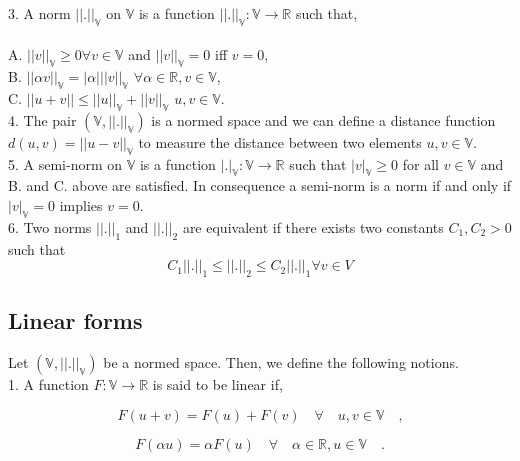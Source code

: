 \documentclass[a4paper,openany]{book}
\begin{document}
\begin{appendices}
3. A norm $||.||_\mathbb{V}$ on $\mathbb{V}$ is a function $||.||_\mathbb{V} : \mathbb{V} \rightarrow \mathbb{R}$ such that,
\\ 
\\
A. $||v||_\mathbb{V} \geq 0 \forall v \in \mathbb{V}$ and $||v||_\mathbb{V} = 0$ iff $v=0$,\\
B. $||\alpha v||_\mathbb{V} = |\alpha| ||v||_\mathbb{V}$  $\forall \alpha \in \mathbb{R}, v \in \mathbb{V}$,\\
C. $||u+v|| \leq ||u||_\mathbb{V} + ||v||_\mathbb{V}$ $u,v \in \mathbb{V}$.\\

4. The pair $(\mathbb{V},||.||_\mathbb{V})$ is a normed space and we can define a distance function $d(u,v) = ||u-v||_\mathbb{V}$ to measure the distance between two elements $u,v \in \mathbb{V}$.\\

5. A semi-norm on $\mathbb{V}$ is a function $|.|_\mathbb{V} : \mathbb{V} \rightarrow \mathbb{R}$ such that $|v|_\mathbb{V} \geq 0$ for all $v \in \mathbb{V}$ and B. and C. above are satisfied. In consequence a semi-norm is a norm if and only if $|v|_\mathbb{V} = 0$ implies  $v = 0$.\\

6. Two norms $||.||_1$ and $||.||_2$ are equivalent if there exists two constants $C_1,C_2 > 0$ such that \\

\begin{equation} \label{norm_equivalent}
C_1||.||_1 \leq ||.||_2 \leq C_2 ||.||_1 \forall v \in V
\end{equation}

\subsection{Linear forms}

Let $(\mathbb{V,||.||_\mathbb{V}})$ be a normed space. Then, we define the following notions.\\

1. A function $F : \mathbb{V} \rightarrow \mathbb{R}$ is said to be linear if,

\begin{equation} 
F(u+v) = F(u) + F(v) \quad \forall \quad u,v \in \mathbb{V} \quad \textrm{,}
\end{equation}

\begin{equation} 
F(\alpha u) = \alpha F(u) \quad \forall \quad \alpha \in \mathbb{R}, u \in \mathbb{V} \quad \textrm{.}
\end{equation}


\end{appendices}
\end{document}
